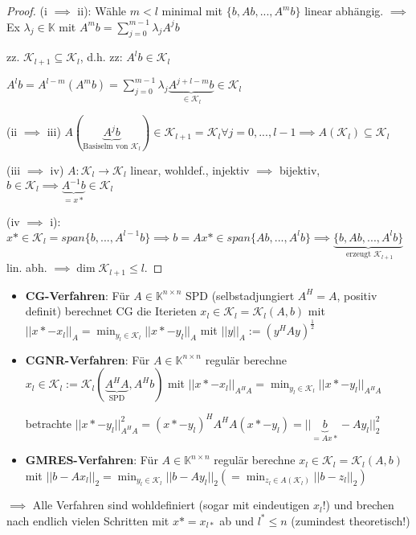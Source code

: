 \begin{proof}
	(i $\implies$ ii): Wähle $m < l$ minimal mit $\{b, Ab, ..., A^mb\}$ linear abhängig. $\implies$ Ex $\lambda_j \in \mathbb{K}$ mit $A^mb = \sum_{j=0}^{m-1} \lambda_j A^j b$
	
	zz. $\mathcal{K}_{l+1} \subseteq \mathcal{K}_l$, d.h. zz: $A^lb \in \mathcal{K}_l$
	
	$A^lb = A^{l-m}(A^mb) = \sum_{j=0}^{m-1} \lambda_j \underbrace{A^{j+l-m}b}_{\in \mathcal{K}_l} \in \mathcal{K}_l$
	
	(ii $\implies$ iii) $A(\underbrace{A^jb}_{\text{Basiselm von } \mathcal{K}_l}) \in \mathcal{K}_{l+1} = \mathcal{K}_l \forall j=0, ..., l-1 \implies A(\mathcal{K}_l) \subseteq \mathcal{K}_l$
	
	(iii $\implies$ iv) $A: \mathcal{K}_l \rightarrow \mathcal{K}_l$ linear, wohldef., injektiv $\implies$ bijektiv, $b \in \mathcal{K}_l \implies \underbrace{A^{-1}b}_{=x*} \in \mathcal{K}_l$
	
	(iv $\implies$ i): $x* \in \mathcal{K}_l = span\{b, ..., A^{l-1}b\} \implies b = Ax* \in span\{Ab, ..., A^lb\} \implies \underbrace{\{b, Ab, ..., A^lb\}}_{\text{ erzeugt } \mathcal{K}_{l+1}}$ lin. abh. $\implies \dim \mathcal{K}_{l+1} \leq l$.
\end{proof}

\begin{example}
	\begin{itemize}
		\item \textbf{CG-Verfahren}: Für $A \in \mathbb{K}^{n \times n}$ SPD (selbstadjungiert $A^H=A$, positiv definit) berechnet CG die Iterieten $x_l \in \mathcal{K}_l = \mathcal{K}_l(A,b)$ mit $||x* - x_l||_A = \min_{y_l \in \mathcal{K}_l} ||x* - y_l||_A$ mit $||y||_A := (y^HAy)^{\frac{1}{2}}$
		
		\item \textbf{CGNR-Verfahren}: Für $A \in \mathbb{K}^{n\times n}$ regulär berechne $x_l \in \mathcal{K}_l := \mathcal{K}_l(\underbrace{A^HA}_{\text{SPD}}, A^Hb)$ mit $||x* - x_l||_{A^HA} = \min_{y_l \in \mathcal{K}_l} ||x* - y_l||_{A^HA}$
		
		betrachte $||x* - y_l||_{A^HA}^2 = (x* - y_l)^H A^H A (x* - y_l) = ||\underbrace{b}_{=Ax*} - Ay_l||_2^2$
		
		\item \textbf{GMRES-Verfahren}: Für $A \in \mathbb{K}^{n\times n}$ regulär berechne $x_l \in \mathcal{K}_l = \mathcal{K}_l(A, b)$ mit $||b - Ax_l||_2 = \min_{y_l \in \mathcal{K}_l} ||b - Ay_l||_2 (= \min_{z_l \in A(\mathcal{K}_l)} ||b - z_l||_2)$
	\end{itemize}
	$\implies$ Alle Verfahren sind wohldefiniert (sogar mit eindeutigen $x_l$!) und brechen nach endlich vielen Schritten mit $x* = x_{l*}$ ab und $l^* \leq n$ (zumindest theoretisch!)
\end{example}

